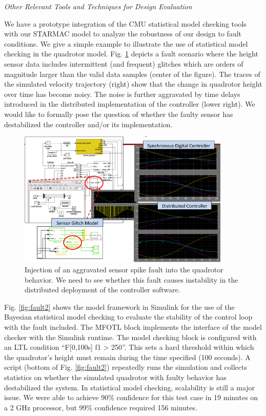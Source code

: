 \emph{Other Relevant Tools and Techniques for Design Evaluation}

We have a prototype integration of the CMU statistical model checking tools with our STARMAC model to analyze the robustness of our design to fault conditions.  We give a simple example to illustrate the use of statistical model checking in the quadrotor model.  Fig. \ref{fig:fault1} depicts a fault scenario where the height sensor data includes intermittent (and frequent) glitches which are orders of magnitude larger than the valid data samples (center of the figure).  The traces of the simulated velocity trajectory (right) show that the change in quadrotor height over time has become noisy.  The noise is further aggravated by time delays introduced in the distributed implementation of the controller (lower right).  We would like to formally pose the question of whether the faulty sensor has destabilized the controller and/or its implementation. 

\begin{figure}[thpb]
\centering
\includegraphics[width=0.9\textwidth]{img/FaultModeling}
\caption{Injection of an aggravated sensor spike fault into the quadrotor behavior. We need to see whether this fault
 causes instability in the distributed deployment of the controller software.}
\label{fig:fault1}
\end{figure}

Fig. \ref{fig:fault2} shows the model framework in Simulink for the use of the Bayesian statistical model checking
\cite{PZ_smc} to evaluate the stability of the control loop with the fault included. The MFOTL block implements 
the interface of the model checker with the Simulink runtime.  The model checking block is configured with an LTL 
condition ``F[0,100s] f1 > 250''.  This sets a hard threshold within which the quadrotor's height must remain during the time specified (100 seconds). A script (bottom of Fig. \ref{fig:fault2}) repeatedly runs the simulation and collects statistics on whether the simulated quadrotor with faulty behavior has destabilized the system. 
In statistical model checking, scalability is still a major issue. We were able to achieve 90\% confidence for this test case in 19 minutes on a 2 GHz processor, but 99\% confidence required 156 minutes.

